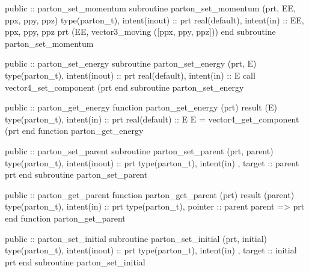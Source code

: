 \eatline
\nwendcode{}\nwdocspar
\nwenddocs{}\plusendmoddef
  public :: parton_set_momentum
\nwendcode{}\plusendmoddef
  subroutine parton_set_momentum (prt, EE, ppx, ppy, ppz)
    type(parton_t), intent(inout) :: prt
    real(default), intent(in) :: EE, ppx, ppy, ppz
    prt%
         (EE, vector3_moving ([ppx, ppy, ppz]))
  end subroutine parton_set_momentum

\eatline
\nwendcode{}\nwdocspar
\nwenddocs{}\plusendmoddef
  public :: parton_set_energy
\nwendcode{}\plusendmoddef
  subroutine parton_set_energy (prt, E)
    type(parton_t), intent(inout) :: prt
    real(default), intent(in) :: E
    call vector4_set_component (prt%
  end subroutine parton_set_energy

\eatline
\nwendcode{}\nwdocspar
\nwenddocs{}\plusendmoddef
  public :: parton_get_energy
\nwendcode{}\plusendmoddef
  function parton_get_energy (prt) result (E)
    type(parton_t), intent(in) :: prt
    real(default) :: E
    E = vector4_get_component (prt%
  end function parton_get_energy

\eatline
\nwendcode{}\nwdocspar
\nwenddocs{}\plusendmoddef
  public :: parton_set_parent
\nwendcode{}\plusendmoddef
  subroutine parton_set_parent (prt, parent)
    type(parton_t), intent(inout) :: prt
    type(parton_t), intent(in) , target :: parent
    prt%
  end subroutine parton_set_parent

\eatline
\nwendcode{}\nwdocspar
\nwenddocs{}\plusendmoddef
  public :: parton_get_parent
\nwendcode{}\plusendmoddef
  function parton_get_parent (prt) result (parent)
    type(parton_t), intent(in) :: prt
    type(parton_t), pointer :: parent
    parent => prt%
  end function parton_get_parent

\eatline
\nwendcode{}\nwdocspar
\nwenddocs{}\plusendmoddef
  public :: parton_set_initial
\nwendcode{}\plusendmoddef
  subroutine parton_set_initial (prt, initial)
    type(parton_t), intent(inout) :: prt
    type(parton_t), intent(in) , target :: initial
    prt%
  end subroutine parton_set_initial


